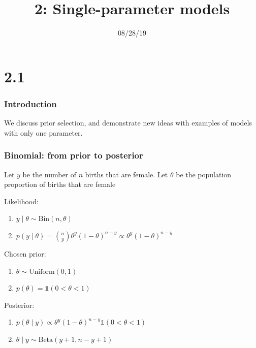 \documentclass{beamer}
\title["2"]{2: Single-parameter models}
\date{08/28/19}
\begin{document}

\begin{frame}
\titlepage 
\end{frame}

\section{2.1}

\begin{frame}
\frametitle{Introduction}

We discuss prior selection, and demonstrate new ideas with examples of models with only one parameter.


\end{frame}



\begin{frame}
\frametitle{Binomial: from prior to posterior}

Let $y$ be the number of $n$ births that are female. Let $\theta$ be the population proportion of births that are female 
\newline

Likelihood:
\begin{enumerate}
\item $y \mid \theta \sim \text{Bin}(n, \theta)$
\item $p(y \mid \theta) = \binom{n}{y} \theta^y (1-\theta)^{n-y} \propto \theta^y (1-\theta)^{n-y}$
\end{enumerate}

Chosen prior:
\begin{enumerate}
\item $\theta \sim \text{Uniform}(0,1)$
\item $p(\theta) = \mathbb{1}(0 < \theta < 1 )$
\end{enumerate}
\pause

Posterior:
\begin{enumerate}
\item $p(\theta \mid y) \propto \theta^y (1-\theta)^{n-y}\mathbb{1}(0 < \theta < 1 )$
\item $\theta \mid y \sim \text{Beta}(y+1, n-y+1)$
\end{enumerate}

\end{frame}
\end{document}
